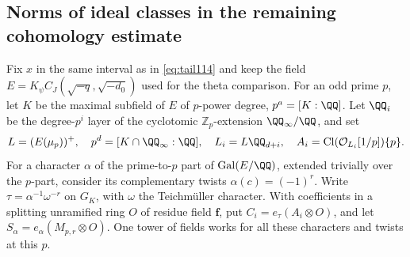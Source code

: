 \documentclass[a4paper,11pt]{article}
\theoremstyle{definition}
\theoremstyle{remark}
\newcommand{\ZZ}{\mathbb Z}\newcommand{\ord}{\operatorname{ord}}
\numberwithin{equation}{section}
\begin{document}
\subsection{Norms of ideal classes in the remaining cohomology estimate}\label{nav:III-31}
Fix \(x\) in the same interval as in \eqref{eq:tail114} and keep
the field \(E=K_\psi C_J(\sqrt{-q},\sqrt{-d_0})\) used for the
theta comparison. For an odd prime \(p\), let \(K\) be the
maximal subfield of \(E\) of \(p\)-power degree, \(p^a=[K:\QQ]\).
Let \(\QQ_i\) be the degree-\(p^i\) layer of the cyclotomic
\(\ZZ_p\)-extension \(\QQ_\infty/\QQ\), and set
\[
 L=(E(\mu_p))^+,\quad p^d=[K\cap\QQ_\infty:\QQ],\quad
 L_i=L\QQ_{d+i},\quad A_i=\operatorname{Cl}(\mathcal O_{L_i}[1/p])\{p\}.
\]
For a character \(\alpha\) of the prime-to-\(p\) part of
\(\operatorname{Gal}(E/\QQ)\), extended trivially over the
\(p\)-part, consider its complementary twists
\(\alpha(c)=(-1)^r\). Write \(\tau=\alpha^{-1}\omega^{-r}\)
on \(G_K\), with \(\omega\) the Teichmüller character. With
coefficients in a splitting unramified ring \(O\) of residue
field \(\mathbf f\), put \(C_i=e_\tau(A_i\otimes O)\), and
let \(S_\alpha=e_\alpha(M_{p,r}\otimes O)\). One tower of
fields works for all these characters and twists at this \(p\).
\end{document}
